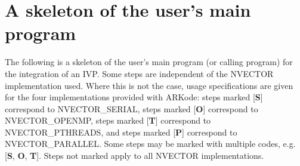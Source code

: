 \documentclass[letterpaper,10pt,english]{sphinxmanual}
\begin{document}
\section{A skeleton of the user's main program}
\label{c_interface/Skeleton::doc}\label{c_interface/Skeleton:a-skeleton-of-the-user-s-main-program}\label{c_interface/Skeleton:cinterface-skeleton}
The following is a skeleton of the user's main program (or calling
program) for the integration of an IVP.  Some steps are independent of
the NVECTOR implementation used.  Where this is not the case, usage
specifications are given for the four implementations provided with
ARKode: steps marked {[}\textbf{S}{]} correspond to NVECTOR\_SERIAL, steps
marked {[}\textbf{O}{]} correspond to NVECTOR\_OPENMP, steps marked {[}\textbf{T}{]}
correspond to NVECTOR\_PTHREADS, and steps marked {[}\textbf{P}{]} correspond to
NVECTOR\_PARALLEL.  Some steps may be marked with multiple codes,
e.g. {[}\textbf{S}, \textbf{O}, \textbf{T}{]}.  Steps not marked apply to all NVECTOR
implementations.
\end{document}
